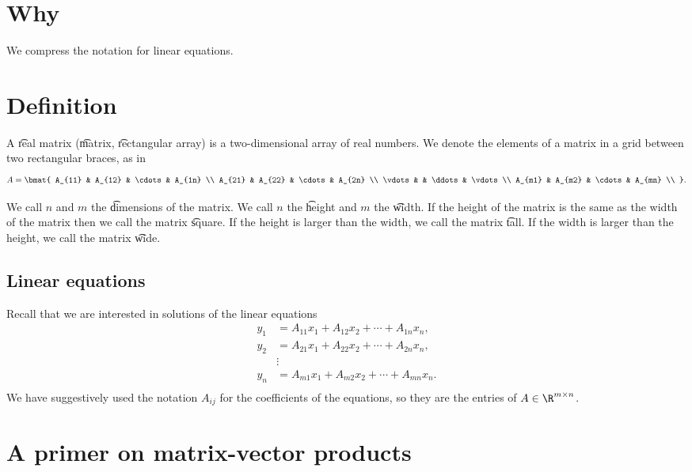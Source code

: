 
\section*{Why}

We compress the notation for linear equations.

\section*{Definition}

A \t{real matrix} (\t{matrix}, \t{rectangular array}) is a two-dimensional array of real numbers.
We denote the elements of a matrix in a grid between two rectangular braces, as in
  \[
A = \bmat{
A_{11} & A_{12} & \cdots & A_{1n} \\
A_{21} & A_{22} & \cdots & A_{2n} \\
\vdots & & \ddots & \vdots \\
A_{m1} & A_{m2} & \cdots & A_{mn} \\
}.
  \]

We call $n$ and $m$ the \t{dimensions} of the matrix.
We call $n$ the \t{height} and $m$ the \t{width}.
If the height of the matrix is the same as the width of the matrix then we call the matrix \t{square}.
If the height is larger than the width, we call the matrix \t{tall}.
If the width is larger than the height, we call the matrix \t{wide}.

\subsection*{Linear equations}

Recall that we are interested in solutions of the linear equations
  \[
\begin{aligned}
y_1 &= A_{11}x_1 + A_{12}x_2 + \cdots + A_{1n}x_n, \\
y_2 &= A_{21}x_1 + A_{22}x_2 + \cdots + A_{2n}x_n, \\
&\vdots \\
y_n &= A_{m1}x_1 + A_{m2}x_2 + \cdots + A_{mn}x_n. \\
\end{aligned}
  \]
We have suggestively used the notation $A_{ij}$ for the coefficients of the equations, so they are the entries of $A \in \R ^{m \times n}$.

\section*{A primer on matrix-vector products}

